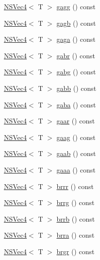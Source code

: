 \begin{DoxyCompactItemize}
\item 
\hyperlink{structNSVec4}{N\-S\-Vec4}$<$ T $>$ \hyperlink{structNSVec4_ab5b19cc27b7174eed600d9305c5a5fe8}{gagg} () const 
\item 
\hyperlink{structNSVec4}{N\-S\-Vec4}$<$ T $>$ \hyperlink{structNSVec4_a577cadd17f349a29a50be262dbac526f}{gagb} () const 
\item 
\hyperlink{structNSVec4}{N\-S\-Vec4}$<$ T $>$ \hyperlink{structNSVec4_a0ad91bc0aa9a61aaa21c864cd458479a}{gaga} () const 
\item 
\hyperlink{structNSVec4}{N\-S\-Vec4}$<$ T $>$ \hyperlink{structNSVec4_a98fed3819f662465cbd59bf5849530ab}{gabr} () const 
\item 
\hyperlink{structNSVec4}{N\-S\-Vec4}$<$ T $>$ \hyperlink{structNSVec4_a59d576489278ac2b76fe51113fac0002}{gabg} () const 
\item 
\hyperlink{structNSVec4}{N\-S\-Vec4}$<$ T $>$ \hyperlink{structNSVec4_adcbc59d0131365bd1d9f68416955b143}{gabb} () const 
\item 
\hyperlink{structNSVec4}{N\-S\-Vec4}$<$ T $>$ \hyperlink{structNSVec4_a630f197e0e36e0bd58b1fc3d1c3eefd6}{gaba} () const 
\item 
\hyperlink{structNSVec4}{N\-S\-Vec4}$<$ T $>$ \hyperlink{structNSVec4_aba471f52a6c7fac79a078efeae362925}{gaar} () const 
\item 
\hyperlink{structNSVec4}{N\-S\-Vec4}$<$ T $>$ \hyperlink{structNSVec4_a05a1350ebe98b5716064dd35429e67ce}{gaag} () const 
\item 
\hyperlink{structNSVec4}{N\-S\-Vec4}$<$ T $>$ \hyperlink{structNSVec4_a4607f18dea54497b76f72d4729c2e4ff}{gaab} () const 
\item 
\hyperlink{structNSVec4}{N\-S\-Vec4}$<$ T $>$ \hyperlink{structNSVec4_aa6b26c203320ce53e6dbb191f7598f77}{gaaa} () const 
\item 
\hyperlink{structNSVec4}{N\-S\-Vec4}$<$ T $>$ \hyperlink{structNSVec4_a39b3e0c4456b9e3e6424347715d5008c}{brrr} () const 
\item 
\hyperlink{structNSVec4}{N\-S\-Vec4}$<$ T $>$ \hyperlink{structNSVec4_a3be39ed42a0b59c73ed6770649f56dec}{brrg} () const 
\item 
\hyperlink{structNSVec4}{N\-S\-Vec4}$<$ T $>$ \hyperlink{structNSVec4_a5b45992305e19dc54c92d8f4cb36c9ca}{brrb} () const 
\item 
\hyperlink{structNSVec4}{N\-S\-Vec4}$<$ T $>$ \hyperlink{structNSVec4_a01879b1d2f2f5ddc151256818748e879}{brra} () const 
\item 
\hyperlink{structNSVec4}{N\-S\-Vec4}$<$ T $>$ \hyperlink{structNSVec4_a6d5ad20579ff313925535c9a7f3be1d1}{brgr} () const 

\end{DoxyCompactItemize}

